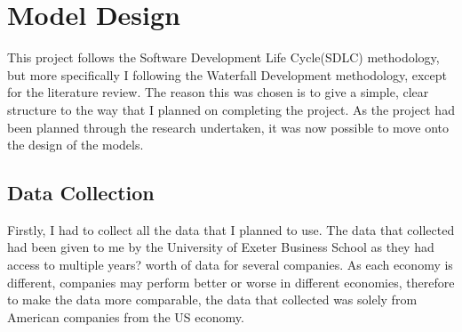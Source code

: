 \documentclass[11pt]{article}
\begin{document}
\section{Model Design}
This project follows the Software Development Life Cycle(SDLC) methodology, but more specifically I following the Waterfall Development methodology, except for the literature review. The reason this was chosen is to give a simple, clear structure to the way that I planned on completing the project. As the project had been planned through the research undertaken, it was now possible to move onto the design of the models. 
\subsection{Data Collection}
Firstly, I had to collect all the data that I planned to use. The data that collected had been given to me by the University of Exeter Business School as they had access to multiple years? worth of data for several companies. As each economy is different, companies may perform better or worse in different economies, therefore to make the data more comparable, the data that collected was solely from American companies from the US economy.
\end{document}

